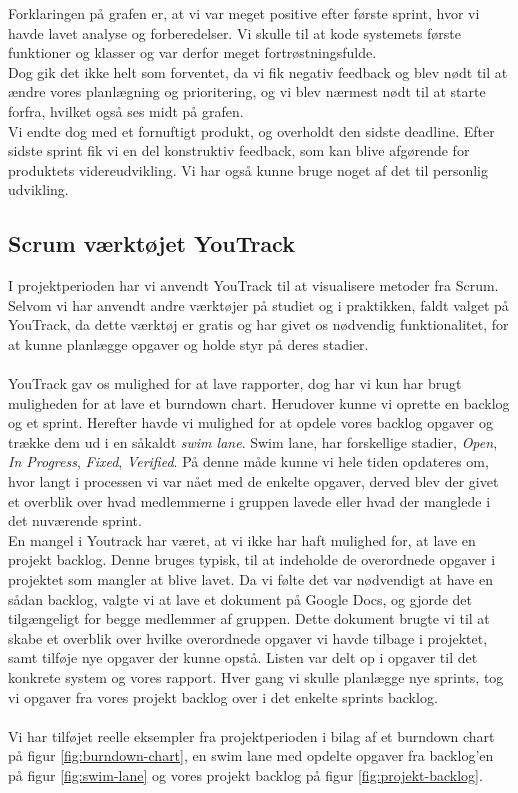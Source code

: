 \noindent
Forklaringen på grafen er, at vi var meget positive efter første sprint, hvor vi havde lavet analyse og forberedelser.
Vi skulle til at kode systemets første funktioner og klasser og var derfor meget fortrøstningsfulde.
\\
Dog gik det ikke helt som forventet, da vi fik negativ feedback og blev nødt til at ændre vores planlægning og prioritering,
og vi blev nærmest nødt til at starte forfra, hvilket også ses midt på grafen.
\\
Vi endte dog med et fornuftigt produkt, og overholdt den sidste deadline. Efter sidste sprint fik vi en del konstruktiv feedback, 
som kan blive afgørende for produktets videreudvikling. Vi har også kunne bruge noget af det til personlig udvikling.

\subsection{Scrum værktøjet YouTrack}
I projektperioden har vi anvendt YouTrack til at visualisere metoder fra Scrum.
\\
Selvom vi har anvendt andre værktøjer på studiet og i praktikken, faldt valget på YouTrack, da dette værktøj er gratis og
har givet os nødvendig funktionalitet, for at kunne planlægge opgaver og holde styr på deres stadier.
\\\\
YouTrack gav os mulighed for at lave rapporter, dog har vi kun har brugt muligheden for at lave et burndown chart. Herudover kunne vi oprette
en backlog og et sprint. Herefter havde vi mulighed for at opdele vores backlog opgaver og trække dem ud i en såkaldt \textit{swim lane}.
Swim lane, har forskellige stadier, \textit{Open}, \textit{In Progress}, \textit{Fixed}, \textit{Verified}. På denne måde kunne vi hele tiden opdateres om, hvor langt i processen vi var nået med de enkelte opgaver, derved blev der givet et overblik over hvad medlemmerne i gruppen lavede eller hvad der manglede i det nuværende sprint.
\\
En mangel i Youtrack har været, at vi ikke har haft mulighed for, at lave en projekt backlog. Denne bruges typisk, til at indeholde de overordnede opgaver i projektet som mangler at blive lavet.
Da vi følte det var nødvendigt at have en sådan backlog, valgte vi at lave et dokument på Google Docs, og gjorde det tilgængeligt for begge medlemmer af gruppen.
Dette dokument brugte vi til at skabe et overblik over hvilke overordnede opgaver vi havde tilbage i projektet, samt tilføje nye opgaver der kunne opstå.
Listen var delt op i opgaver til det konkrete system og vores rapport. Hver gang vi skulle planlægge nye sprints, tog vi opgaver fra vores projekt backlog over i det enkelte sprints backlog.
\\\\
Vi har tilføjet reelle eksempler fra projektperioden i bilag af et burndown chart på figur \ref{fig:burndown-chart}, en swim lane med opdelte opgaver fra backlog'en på figur \ref{fig:swim-lane} og vores projekt backlog på figur \ref{fig:projekt-backlog}.
